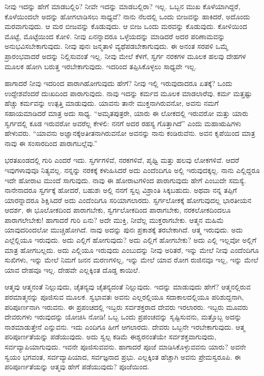 ನೀವು ಇದನ್ನು ಹೇಗೆ ಮಾಡಬಲ್ಲಿರಿ? ನೀವೇ ಇದನ್ನು ಮಾಡಬಲ್ಲಿರಾ? ಇಲ್ಲ. ಒಬ್ಬನ ಮುಖ ಕೊಳೆಯಾಗಿದ್ದರೆ, ಕೊಳೆಯಿಂದಲೇ ಅದನ್ನು ಹೋಗಲಾಡಿಸಲು ಸಾಧ್ಯವೆ? ನಾನು ನೆಲದಲ್ಲಿ ಒಂದು ಬೀಜವನ್ನು ಹಾಕಿದರೆ, ಅದೊಂದು ಮರವಾಗುವುದು. ಆ ಮರ ಬೀಜವನ್ನು ಕೊಡುವುದು. ಆ ಬೀಜ ಒಂದು ಮರವನ್ನು ಕೊಡುವುದು. ಕೋಳಿಯಿಂದ ಮೊಟ್ಟೆ, ಮೊಟ್ಟೆಯಿಂದ ಕೋಳಿ. ನೀವು ಏನನ್ನಾದರೂ ಒಳ್ಳೆಯದನ್ನು ಮಾಡಿದರೆ ಅದರ ಪರಿಣಾಮವನ್ನು ಅನುಭವಿಸಬೇಕಾಗುವುದು. ನೀವು ಪುನಃ ಜನ್ಮತಾಳಿ ವ್ಯಥೆಪಡಬೇಕಾಗುವುದು. ಈ ಅನಂತ ಸರಪಳಿ ಒಮ್ಮೆ ಪ್ರಾರಂಭವಾದರೆ ಅದನ್ನು ನಿಲ್ಲಿಸುವಂತೆ ಇಲ್ಲ. ನೀವು ಮೇಲೆ ಕೆಳಗೆ, ಸ್ವರ್ಗ ನರಕಗಳ ಮೂಲಕ ಹಲವು ದೇಹಗಳ ಮೂಲಕ ಹೋಗಿ ಬರುತ್ತ ಇರಬೇಕಾಗುವುದು. ಇದರಿಂದ ತಪ್ಪಿಸಿಕೊಳ್ಳಲು ಸಾಧ್ಯವೇ ಇಲ್ಲ.

ಹಾಗಾದರೆ ನೀವು ಇದರಿಂದ ಪಾರಾಗಿಹೋಗುವುದು ಹೇಗೆ? ನೀವು ಇಲ್ಲಿ ಇರುವುದಾದರೂ ಏತಕ್ಕೆ? ಒಂದು ಉದ್ದೇಶವೆಂದರೆ ದುಃಖದಿಂದ ಪಾರಾಗುವುದು. ನಾವು ಇದನ್ನು ಕರ್ಮದ ಮೂಲಕ ಮಾಡಲಾರೆವು. ಕರ್ಮ ಮತ್ತಷ್ಟು ಹೆಚ್ಚು ಕರ್ಮವನ್ನು ಉತ್ಪತ್ತಿ ಮಾಡುವುದು. ಯಾವನು ತಾನೇ ಮುಕ್ತನಾಗಿರುವನೋ, ಅವನು ನಮಗೆ ಸಹಾಯಮಾಡಿದರೆ ಮಾತ್ರ ಅದು ಸಾಧ್ಯ. “ಅಮೃತಪುತ್ರರೇ, ಯಾರು ಈ ಲೋಕದಲ್ಲಿ ಇರುವರೋ ಮತ್ತು ಯಾರು ಸ್ವರ್ಗದಲ್ಲಿ ಕೂಡ ಇರುವರೋ ಅವರೆಲ್ಲ ಕೇಳಲಿ: ನನಗೆ ಅದರ ರಹಸ್ಯ ಗೊತ್ತಾಗಿದೆ'' ಎಂದು ಮಹಾಋಷಿಗಳು ಹೇಳುವರು. “ಯಾವನು ಅಜ್ಞಾನಕ್ಕೆ\break ಅತೀತನಾಗಿರುವನೋ ಅವನನ್ನು ನಾನು ಕಂಡಿರುವೆನು. ಅವನ ಕೃಪೆಯಿಂದ ಮಾತ್ರ ನಾವು ಈ ಸಂಸಾರದಿಂದ ಪಾರಾಗಬಲ್ಲೆವು.”

ಭರತಖಂಡದಲ್ಲಿ ಗುರಿ ಎಂದರೆ ಇದು. ಸ್ವರ್ಗಗಳಿವೆ, ನರಕಗಳಿವೆ, ಪೃಥ್ವಿ ಮತ್ತು ಹಲವು ಲೋಕಗಳಿವೆ. ಆದರೆ ಇವುಗಳಾವುವೂ ನಿತ್ಯವಲ್ಲ. ನನ್ನನ್ನು ನರಕಕ್ಕೆ ಕಳುಹಿಸಿದರೆ ಅದು ಎಂದೆಂದಿಗೂ ಅಲ್ಲಿ ಇರುವುದಕ್ಕಲ್ಲ. ನಾನು ಎಲ್ಲಿದ್ದರೂ ಇದೇ ಹೋರಾಟ ಮುಂದೆ ಸಾಗುವುದು. ನಾವು ಈ ಹೋರಾಟಗಳಿಂದ ಪಾರಾಗುವುದು ಹೇಗೆ ಎಂಬುದೇ ಸಮಸ್ಯೆ. ನಾನೇನಾದರೂ ಸ್ವರ್ಗಕ್ಕೆ ಹೋದರೆ, ಬಹುಶಃ ಅಲ್ಲಿ ನನಗೆ ಸ್ವಲ್ಪ ವಿಶ್ರಾಂತಿ ಸಿಕ್ಕಬಹುದು. ಅಥವಾ ನನ್ನ ತಪ್ಪಿಗೆ ಯಾರನ್ನಾದರೂ ಶಿಕ್ಷಿಸಿದರೆ ಅದು ಎಂದೆಂದಿಗೂ ಸರಿಯಾಗಲಾರದು. ಸ್ವರ್ಗಲೋಕಕ್ಕೆ ಹೋಗುವುದಲ್ಲ ಭಾರತೀಯನ ಆದರ್ಶ, ಈ ಭೂಲೋಕದಿಂದ ಪಾರಾಗಬೇಕು, ಸ್ವರ್ಗಲೋಕದಿಂದ ಪಾರಾಗಬೇಕು, ನರಕಲೋಕದಿಂದಲೂ ಪಾರಾಗಲೇಬೇಕು! ಹಾಗಾದರೆ ಗುರಿ ಏನು? ಅದೇ ಮುಕ್ತಿ, ನೀವೆಲ್ಲ ಮುಕ್ತರಾಗಬೇಕು. ಆತ್ಮನ ಮಹಿಮೆ ಯಾವುದರಿಂದಲೋ ಮುಚ್ಚಿಹೋಗಿದೆ. ನಾವು ಅದನ್ನು ಪುನಃ ಪ್ರಕಾಶಕ್ಕೆ ತರಬೇಕಾಗಿದೆ. ಆತ್ಮ ಇರುವುದು. ಅದು ಎಲ್ಲೆಲ್ಲಿಯೂ ಇರುವುದು. ಅದು ಎಲ್ಲಿಗೆ ಹೋಗುವುದು? ಅದು ಎಲ್ಲಿಗೆ ಹೋಗಬೇಕು? ಅದು ಎಲ್ಲಿ ಇಲ್ಲವೋ ಅಲ್ಲಿಗೆ ಮಾತ್ರ ಹೋಗಬಲ್ಲದು. ಅದು ಎಲ್ಲಿಯೂ ಇರುವುದು ಎಂಬುದನ್ನು ನೀವು ಅರಿತರೆ, ಇನ್ನು ಮೇಲೆ ನೀವು ಎಂದೆಂದಿಗೂ ಸುಖಿಗಳು, ಇನ್ನು ಮೇಲೆ ನಿಮಗೆ ಜನನ ಮರಣಗಳಿಲ್ಲ, ಇನ್ನು ಮೇಲೆ ಯಾವ ರೋಗ ರುಜಿನವೂ ಇಲ್ಲ, ಇನ್ನು ಮೇಲೆ ಯಾವ ದೇಹವೂ ಇಲ್ಲ. ದೇಹವೇ ಎಲ್ಲಕ್ಕಿಂತ ದೊಡ್ಡ ಕಾಯಿಲೆ.

ಆತ್ಮವು ಆತ್ಮನಂತೆ ನಿಲ್ಲುವುದು, ಚೈತನ್ಯವು ಚೈತನ್ಯದಂತೆ ನಿಲ್ಲುವುದು. ಇದನ್ನು ಮಾಡುವುದು ಹೇಗೆ? ಆತ್ಮನಲ್ಲಿರುವ ಪರಮಾತ್ಮನನ್ನು ಪೂಜಿಸುವ ಮೂಲಕ. ಸ್ವಭಾವತಃ ಅವನು ಎಲ್ಲರಲ್ಲಿಯೂ ಸದಾಕಾಲದಲ್ಲಿಯೂ ಪರಿಶುದ್ದನಾಗಿ, ಪರಿಪೂರ್ಣನಾಗಿ ಇರುವನು. ಈ ಪ್ರಪಂಚದಲ್ಲಿ ಇಬ್ಬರು ಸರ್ವಶಕ್ತರಾದ ದೇವರು ಇರಲಾರರು. ಇಬ್ಬರು ಮೂವರು ದೇವರುಗಳು ಇರುವುದನ್ನು ಯೋಚಿಸಿ ನೋಡಿ! ಒಬ್ಬ ಒಂದು ಪ್ರಪಂಚವನ್ನು ಸೃಷ್ಟಿಸುವನು, ಮತ್ತೊಬ್ಬ ಅದನ್ನು ನಾಶಮಾಡುತ್ತೇನೆ ಎನ್ನುವನು. ಇದು ಎಂದಿಗೂ ಹೀಗೆ ಆಗಲಾರದು. ದೇವರು ಒಬ್ಬನೇ ಇರಬೇಕಾಗುವುದು. ಆತ್ಮ ಪರಿಪೂರ್ಣತೆಯನ್ನು ಪಡೆಯುವುದು. ಅದು ಸ್ವಲ್ಪ ಕಡಿಮೆ ಈಶ್ವರನಂತೆಯೇ ಸರ್ವಶಕ್ತವಾಗುವುದು, ಸರ್ವವ್ಯಾಪಿಯಾಗುವುದು. ಇವನೇ ಪೂಜಿಸುವವನು. ಹಾಗಾದರೆ ಪೂಜೆ ಮಾಡಿಸಿಕೊಳ್ಳುವವನು ಯಾರು? ಅವನೇ ಸ್ವಯಂ ಭಗವಂತ, ಸರ್ವವ್ಯಾಪಿಯಾದ, ಸರ್ವಜ್ಞನಾದ ಪ್ರಭು. ಎಲ್ಲಕ್ಕಿಂತ ಹೆಚ್ಚಾಗಿ ಅವನು ಪ್ರೇಮಸ್ವರೂಪಿ. ಈ ಪರಿಪೂರ್ಣತೆಯನ್ನು ಆತ್ಮವು ಹೇಗೆ ಪಡೆಯುವುದು? ಪೂಜೆಯಿಂದ.

